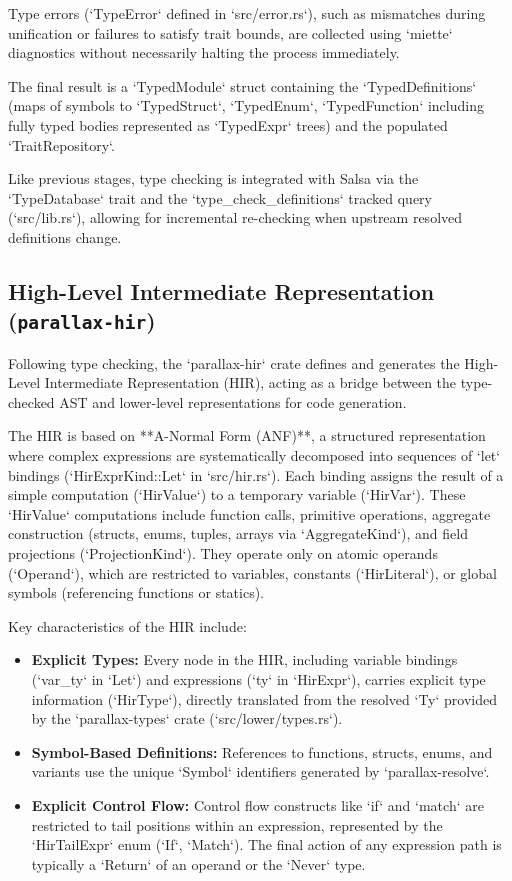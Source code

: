 Type errors (`TypeError` defined in `src/error.rs`), such as mismatches during unification or failures to satisfy trait bounds, are collected using `miette` diagnostics without necessarily halting the process immediately.

The final result is a `TypedModule` struct containing the `TypedDefinitions` (maps of symbols to `TypedStruct`, `TypedEnum`, `TypedFunction` including fully typed bodies represented as `TypedExpr` trees) and the populated `TraitRepository`.

Like previous stages, type checking is integrated with Salsa via the `TypeDatabase` trait and the `type\_check\_definitions` tracked query (`src/lib.rs`), allowing for incremental re-checking when upstream resolved definitions change.

\subsection{High-Level Intermediate Representation (\texttt{parallax-hir})} %
Following type checking, the `parallax-hir` crate defines and generates the High-Level Intermediate Representation (HIR), acting as a bridge between the type-checked AST and lower-level representations for code generation.

The HIR is based on **A-Normal Form (ANF)**, a structured representation where complex expressions are systematically decomposed into sequences of `let` bindings (`HirExprKind::Let` in `src/hir.rs`). Each binding assigns the result of a simple computation (`HirValue`) to a temporary variable (`HirVar`). These `HirValue` computations include function calls, primitive operations, aggregate construction (structs, enums, tuples, arrays via `AggregateKind`), and field projections (`ProjectionKind`). They operate only on atomic operands (`Operand`), which are restricted to variables, constants (`HirLiteral`), or global symbols (referencing functions or statics).

Key characteristics of the HIR include:
\begin{itemize}
    \item \textbf{Explicit Types:} Every node in the HIR, including variable bindings (`var_ty` in `Let`) and expressions (`ty` in `HirExpr`), carries explicit type information (`HirType`), directly translated from the resolved `Ty` provided by the `parallax-types` crate (`src/lower/types.rs`).
    \item \textbf{Symbol-Based Definitions:} References to functions, structs, enums, and variants use the unique `Symbol` identifiers generated by `parallax-resolve`.
    \item \textbf{Explicit Control Flow:} Control flow constructs like `if` and `match` are restricted to tail positions within an expression, represented by the `HirTailExpr` enum (`If`, `Match`). The final action of any expression path is typically a `Return` of an operand or the `Never` type.
\end{itemize}

